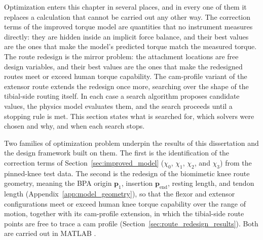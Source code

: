 Optimization enters this chapter in several places, and in every one of them it replaces a calculation that cannot be carried out any other way. The correction terms of the improved torque model are quantities that no instrument measures directly: they are hidden inside an implicit force balance, and their best values are the ones that make the model's predicted torque match the measured torque. The route redesign is the mirror problem: the attachment locations are free design variables, and their best values are the ones that make the redesigned routes meet or exceed human torque capability. The cam-profile variant of the extensor route extends the redesign once more, searching over the shape of the tibial-side routing itself. In each case a search algorithm proposes candidate values, the physics model evaluates them, and the search proceeds until a stopping rule is met. This section states what is searched for, which solvers were chosen and why, and when each search stops.

Two families of optimization problem underpin the results of this dissertation and the design framework built on them. The first is the identification of the correction terms of Section~\ref{sec:improved_model} ($\chi_{0}$, $\chi_{1}$, $\chi_{2}$, and $\chi_{3}$) from the pinned-knee test data. The second is the redesign of the biomimetic knee route geometry, meaning the BPA origin $\mathbf{p}_{1}$, insertion $\mathbf{p}_{\text{end}}$, resting length, and tendon length (Appendix~\ref{app:model_geometry}), so that the flexor and extensor configurations meet or exceed human knee torque capability over the range of motion, together with its cam-profile extension, in which the tibial-side route points are free to trace a cam profile (Section~\ref{sec:route_redesign_results}). Both are carried out in MATLAB \citep{mathworks_optimization_2025}.

